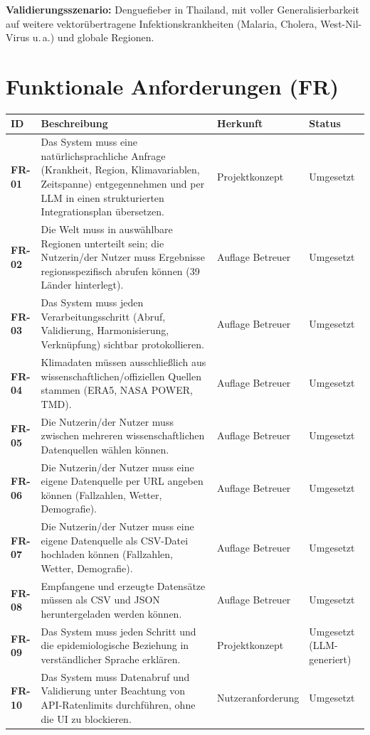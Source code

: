 \documentclass[11pt,a4paper]{article}
\begin{document}
\textbf{Validierungsszenario:} Denguefieber in Thailand, mit voller Generalisierbarkeit
auf weitere vektor\"ubertragene Infektionskrankheiten (Malaria, Cholera, West-Nil-Virus
u.\,a.) und globale Regionen.

\section{Funktionale Anforderungen (FR)}

\begin{longtable}{@{}>{\bfseries}p{1.6cm} L{7.4cm} L{3.6cm} L{2.4cm}@{}}
\toprule
ID & Beschreibung & Herkunft & Status \\
\midrule
\endhead
FR-01 & Das System muss eine nat\"urlichsprachliche Anfrage (Krankheit, Region, Klimavariablen, Zeitspanne) entgegennehmen und per LLM in einen strukturierten Integrationsplan \"ubersetzen. & Projektkonzept & Umgesetzt \\
FR-02 & Die Welt muss in ausw\"ahlbare Regionen unterteilt sein; die Nutzerin/der Nutzer muss Ergebnisse regionsspezifisch abrufen k\"onnen (39 L\"ander hinterlegt). & Auflage Betreuer & Umgesetzt \\
FR-03 & Das System muss jeden Verarbeitungsschritt (Abruf, Validierung, Harmonisierung, Verkn\"upfung) sichtbar protokollieren. & Auflage Betreuer & Umgesetzt \\
FR-04 & Klimadaten m\"ussen ausschlie\ss{}lich aus wissenschaftlichen/offiziellen Quellen stammen (ERA5, NASA POWER, TMD). & Auflage Betreuer & Umgesetzt \\
FR-05 & Die Nutzerin/der Nutzer muss zwischen mehreren wissenschaftlichen Datenquellen w\"ahlen k\"onnen. & Auflage Betreuer & Umgesetzt \\
FR-06 & Die Nutzerin/der Nutzer muss eine eigene Datenquelle per URL angeben k\"onnen (Fallzahlen, Wetter, Demografie). & Auflage Betreuer & Umgesetzt \\
FR-07 & Die Nutzerin/der Nutzer muss eine eigene Datenquelle als CSV-Datei hochladen k\"onnen (Fallzahlen, Wetter, Demografie). & Auflage Betreuer & Umgesetzt \\
FR-08 & Empfangene und erzeugte Datens\"atze m\"ussen als CSV und JSON heruntergeladen werden k\"onnen. & Auflage Betreuer & Umgesetzt \\
FR-09 & Das System muss jeden Schritt und die epidemiologische Beziehung in verst\"andlicher Sprache erkl\"aren. & Projektkonzept & Umgesetzt (LLM-generiert) \\
FR-10 & Das System muss Datenabruf und Validierung unter Beachtung von API-Ratenlimits durchf\"uhren, ohne die UI zu blockieren. & Nutzer\-anforderung & Umgesetzt \\

\end{longtable}
\end{document}
